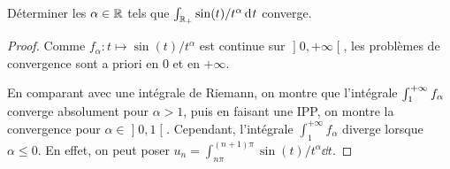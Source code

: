 \documentclass[10pt]{scrartcl}
\title{}
\author{}
\date{}
\begin{document}
    \begin{exo}
        Déterminer les $\alpha\in\operatorname{\mathbb R}$ tels que $\int_{\operatorname{\mathbb R}_+}\sin(t)/t^\alpha\operatorname{d\hskip-1pt} t$ converge.
    \end{exo}

    \begin{proof}
        Comme $f_\alpha : t\mapsto \sin(t)/t^\alpha$ est continue sur 
        $\mathopen]0,+\infty\mathclose[$, les problèmes de convergence sont a priori
        en $0$ et en $+\infty$.

        En comparant avec une intégrale de Riemann, on montre que l'intégrale 
        $\smallint_1^{+\infty}f_\alpha$ converge absolument pour $\alpha > 1$, puis 
        en faisant une IPP, on montre la convergence pour $\alpha\in\mathopen]0,1\mathclose[$.
        Cependant, l'intégrale $\int_1^{+\infty}f_\alpha$ diverge lorsque $\alpha\leq0$.
        En effet, on peut poser $u_n=\int_{n\pi}^{(n+1)\pi}\sin(t)/t^\alpha\dd t$.
    \end{proof}
\end{document}

